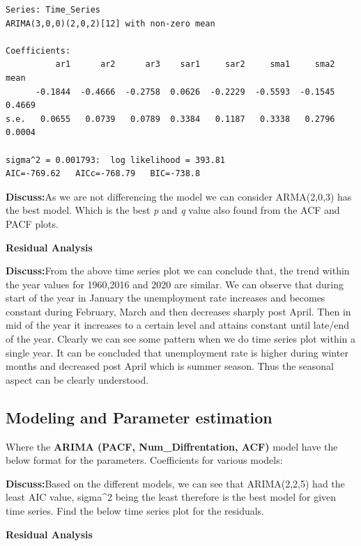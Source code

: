 \documentclass[12pt,a4paper]{book}
\begin{document}
{\begin{verbatim}
Series: Time_Series 
ARIMA(3,0,0)(2,0,2)[12] with non-zero mean 

Coefficients:
          ar1      ar2      ar3    sar1     sar2     sma1     sma2    mean
      -0.1844  -0.4666  -0.2758  0.0626  -0.2229  -0.5593  -0.1545  0.4669
s.e.   0.0655   0.0739   0.0789  0.3384   0.1187   0.3338   0.2796  0.0004

sigma^2 = 0.001793:  log likelihood = 393.81
AIC=-769.62   AICc=-768.79   BIC=-738.8
\end{verbatim}

\textbf{Discuss:}As we are not differencing the model we can consider
ARMA(2,0,3) has the best model. Which is the best \emph{p} and \emph{q}
value also found from the ACF and PACF plots.

\textbf{Residual Analysis}

\textbf{Discuss:}From the above time series plot we can conclude that,
the trend within the year values for 1960,2016 and 2020 are similar. We
can observe that during start of the year in January the unemployment
rate increases and becomes constant during February, March and then
decreases sharply post April. Then in mid of the year it increases to a
certain level and attains constant until late/end of the year. Clearly
we can see some pattern when we do time series plot within a single
year. It can be concluded that unemployment rate is higher during winter
months and decreased post April which is summer season. Thus the
seasonal aspect can be clearly understood.\\

\hypertarget{modeling-and-parameter-estimation}{%
\subsection{\texorpdfstring{\textbf{Modeling and Parameter
estimation}}{Modeling and Parameter estimation}}\label{modeling-and-parameter-estimation}}

\hfill\break
Where the \textbf{ARIMA (PACF, Num\_Diffrentation, ACF)} model have the
below format for the parameters. Coefficients for various models:

\textbf{Discuss:}Based on the different models, we can see that
ARIMA(2,2,5) had the least AIC value, sigma\^{}2 being the least
therefore is the best model for given time series. Find the below time
series plot for the residuals.

\textbf{Residual Analysis}

}
\end{document}
